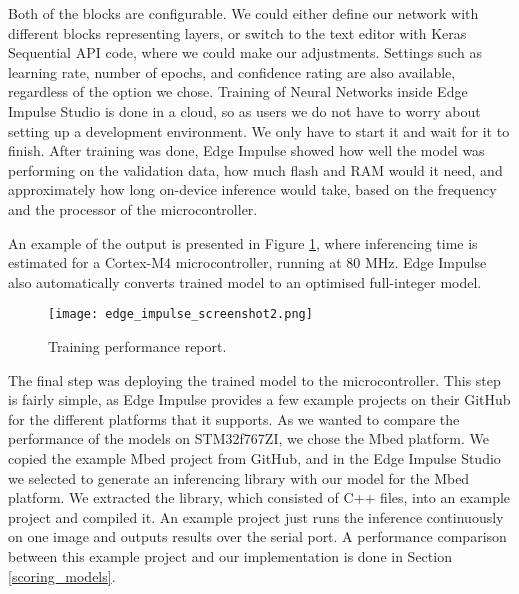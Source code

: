 Both of the blocks are configurable.
We could either define our network with different blocks representing layers, or switch to the text editor with Keras Sequential API code, where we could make our adjustments.
Settings such as learning rate, number of epochs\footnotemark, and confidence rating are also available, regardless of the option we chose.
Training of Neural Networks inside Edge Impulse Studio is done in a cloud, so as users we do not have to worry about setting up a development environment.
We only have to start it and wait for it to finish.
After training was done, Edge Impulse showed how well the model was performing on the validation data, how much flash and RAM would it need, and approximately how long on-device inference would take, based on the frequency and the processor of the microcontroller.

An example of the output is presented in Figure \ref{edge_impulse_screenshot2}, where inferencing time is estimated for a Cortex-M4 microcontroller, running at 80 \si{\mega\hertz}.
Edge Impulse also automatically converts trained model to an optimised full-integer model.
\newline
\begin{figure}[ht]
    \centering
    \texttt{[image: edge\_impulse\_screenshot2.png]} 
    \caption{ Training performance report.}
    \label{edge_impulse_screenshot2}
\end{figure}

The final step was deploying the trained model to the microcontroller.
This step is fairly simple, as Edge Impulse provides a few example projects on their GitHub for the different platforms that it supports.
As we wanted to compare the performance of the models on STM32f767ZI, we chose the Mbed platform.
We copied the example Mbed project from GitHub, and in the Edge Impulse Studio we selected to generate an inferencing library with our model for the Mbed platform.
We extracted the library, which consisted of C++ files, into an example project and compiled it.
An example project just runs the inference continuously on one image and outputs results over the serial port.
A performance comparison between this example project and our implementation is done in Section \ref{scoring_models}.
